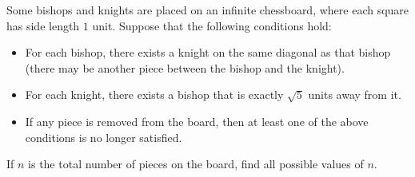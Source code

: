 Some bishops and knights are placed on an infinite chessboard, where each square has side length $1$ unit. Suppose that the following conditions hold:
\begin{itemize}
	\item For each bishop, there exists a knight on the same diagonal as that bishop (there may be another piece between the bishop and the knight).
	\item For each knight, there exists a bishop that is exactly $\sqrt{5}$ units away from it.
	\item If any piece is removed from the board, then at least one of the above conditions is no longer satisfied.
\end{itemize}
If $n$ is the total number of pieces on the board, find all possible values of $n$.